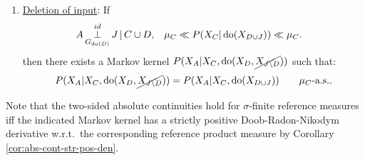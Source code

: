 \begin{Cor}
\begin{enumerate}
\begin{align*}
             A &\idPerp_{G_{\doit(I_B\cup D)}} I_B \given C  \cup D, &          
             \mu_C &\ll P(X_C|\doit(X_B,X_{D\cup J})) \ll \mu_C, \\
                   && \mu_C &\ll P(X_C|\doit(X_{D\cup J})) \ll \mu_C.
         \end{align*}
       \item \underline{Deletion of input}:
         If 
         \begin{align*} 
           A &\operatorname*{\perp}^{id}_{G_{\operatorname{do}(D)}} J \operatorname*{|} C \cup D, &          
             \mu_C &\ll P(X_C|\operatorname{do}(X_{D\cup J})) \ll \mu_C.
         \end{align*}
         then there exists a Markov kernel $P(X_A|X_C,\operatorname{do}(X_{D},\cancel{X_{J\setminus D}}))$ such that:
         \[ P(X_A|X_C,\operatorname{do}(X_{D},\cancel{X_{J\setminus D}})) = P(X_A|X_C,\operatorname{do}(X_{D \cup J})) \qquad \mu_C\text{-a.s.}. \]
    \end{enumerate}
    Note that the two-sided absolute continuities hold for $\sigma$-finite reference measures iff the indicated Markov kernel has a strictly positive Doob-Radon-Nikodym derivative w.r.t.\ the corresponding reference product measure by Corollary \ref{cor:abs-cont-str-pos-den}.
\end{Cor}

